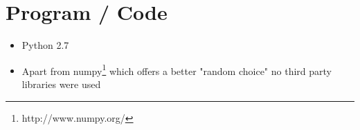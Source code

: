 \documentclass[a0,boxedsections,landscape]{sciposter}
\begin{document}
\begin{multicols}{3}
\begin{figure}[htp]
\begin{minipage}{0,49\textwidth}
    \end{minipage}%
%        
    

\end{figure}


    

\section{Program / Code}

\begin{itemize}

    \item Python 2.7

    \item Apart from numpy\footnote{http://www.numpy.org/} which offers a better "random choice" no third party libraries were used


\end{itemize}
\end{multicols}
\end{document}
